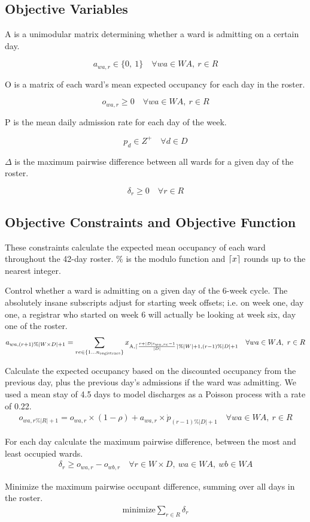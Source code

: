 \documentclass[a4paper]{article}
\DeclarePairedDelimiter{\ceil}{\lceil}{\rceil}
\begin{document}
\subsection{Objective Variables}

A is a unimodular matrix determining whether a ward is admitting on a certain day.

$$a_{wa, r} \in \{0,\ 1\} \quad\forall wa\in WA,\ r\in R$$

O is a matrix of each ward's mean expected occupancy for each day in the roster.

$$o_{wa, r} \ge 0 \quad\forall wa\in WA,\ r\in R$$

P is the mean daily admission rate for each day of the week.

$$p_{d} \in Z^+ \quad\forall d\in D$$

$\Delta$ is the maximum pairwise difference between all wards for a given day of the roster.

$$\delta_r \ge 0 \quad\forall r \in R$$

\subsection{Objective Constraints and Objective Function}

These constraints calculate the expected mean occupancy of each ward throughout the 42-day roster. $\%$ is the modulo function and $\ceil{x}$ rounds up to the nearest integer.

Control whether a ward is admitting on a given day of the 6-week cycle. The absolutely insane subscripts adjust for starting week offsets; i.e. on week one, day one, a registrar who started on week 6 will actually be looking at week six, day one of the roster.
\begin{align}
  a_{wa, (r+1)\%|W\times D|+1} = \sum_{re\in \{1\dots n_\text{registrars}\}}{x_{\text{A}, \ceil{\frac{r+|D|\text{s}_{wa, re}-1}{|D|}} \% |W|+1, (r-1) \% |D|+1}} \quad\forall wa \in WA,\ r \in R
\end{align}

Calculate the expected occupancy based on the discounted occupancy from the previous day, plus the previous day's admissions if the ward was admitting. We used a mean stay of 4.5 days to model discharges as a Poisson process with a rate of 0.22.
\begin{align}
  o_{wa, r\%|R|+1} = o_{wa, r} \times (1-\rho) + a_{wa, r} \times \dot{p}_{(r-1)\%|D|+1} \quad\forall wa \in WA,\ r \in R
\end{align}

For each day calculate the maximum pairwise difference, between the most and least occupied wards.
\begin{align}
  \delta_r \ge o_{wa, r} - o_{wb, r} \quad\forall r \in W\times D,\ wa \in WA,\ wb \in WA
\end{align}

Minimize the maximum pairwise occupant difference, summing over all days in the roster.
\begin{align}
  \text{minimize} \sum_{r\in R}{\delta_r}
\end{align}
\end{document}
